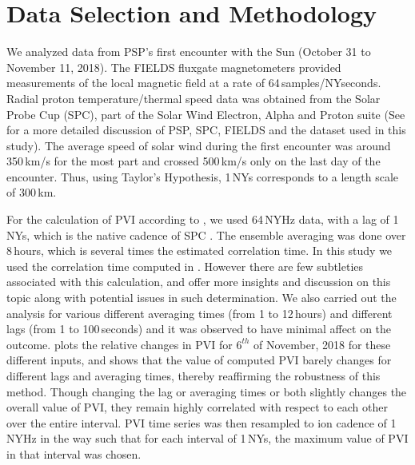     \section{Data Selection and Methodology} \label{sec:data6}

        We analyzed data from PSP's first encounter with the Sun (October 31 to November 11, 2018).
        The FIELDS fluxgate magnetometers provided measurements of the local magnetic field at a
        rate of 64\,samples/NYseconds. Radial proton temperature/thermal speed data was obtained
        from the Solar Probe Cup (SPC), part of the Solar Wind Electron, Alpha and Proton suite
        \citep{Kasper2016} (See  for a more detailed discussion of PSP, SPC, FIELDS
        and the dataset used in this study). The average speed of solar wind during the first
        encounter was around 350\,km/s for the most part and crossed 500\,km/s only on the last day
        of the encounter. Thus, using Taylor’s Hypothesis, 1\,NYs corresponds to a length scale of
        300\,km.

        For the calculation of PVI according to , we used 64\,NYHz data, with a lag of
        1\,NYs, which is the native cadence of SPC \citep{Kasper2016}. The ensemble averaging was
        done over 8\,hours, which is several times the estimated correlation time. In this study we
        used the correlation time computed in \citet{Parashar2020}. However there are few subtleties
        associated with this calculation, and \citet{Smith2001, Isaacs2015, KrishnaJagarlamudi2019,
        Bandyopadhyay2020} offer more insights and discussion on this topic along with potential
        issues in such determination. We also carried out the analysis for various different
        averaging times (from 1 to 12\,hours) and different lags (from 1 to 100\,seconds) and it was
        observed to have minimal affect on the outcome.  plots the relative
        changes in PVI for $6^{th}$ of November, 2018 for these different inputs, and shows that the
        value of computed PVI barely changes for different lags and averaging times, thereby
        reaffirming the robustness of this method. Though changing the lag or averaging times or
        both slightly changes the overall value of PVI, they remain highly correlated with respect
        to each other over the entire interval. PVI time series was then resampled to ion cadence of
        1\,NYHz in the way such that for each interval of 1\,NYs, the maximum value of PVI in that
        interval was chosen.

